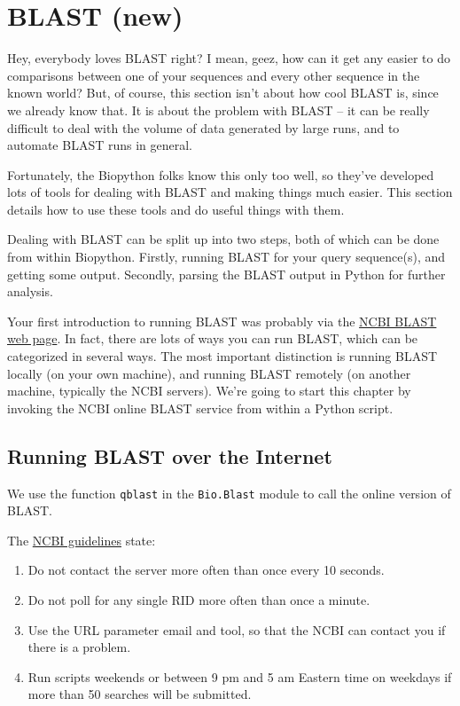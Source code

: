 \chapter{BLAST (new)}
\label{chapter:blast}
Hey, everybody loves BLAST right? I mean, geez, how can it get any easier to do comparisons between one of your sequences and every other sequence in the known world? But, of course, this section isn't about how cool BLAST is, since we already know that. It is about the problem with BLAST -- it can be really difficult to deal with the volume of data generated by large runs, and to automate BLAST runs in general.

Fortunately, the Biopython folks know this only too well, so they've developed lots of tools for dealing with BLAST and making things much easier. This section details how to use these tools and do useful things with them.

Dealing with BLAST can be split up into two steps, both of which can be done from within Biopython.
Firstly, running BLAST for your query sequence(s), and getting some output.
Secondly, parsing the BLAST output in Python for further analysis.

Your first introduction to running BLAST was probably via the \href{https://blast.ncbi.nlm.nih.gov/Blast.cgi}{NCBI BLAST web page}.
In fact, there are lots of ways you can run BLAST, which can be categorized in several ways.
The most important distinction is running BLAST locally (on your own machine),
and running BLAST remotely (on another machine, typically the NCBI servers).
We're going to start this chapter by invoking the NCBI online BLAST service
from within a Python script.

\section{Running BLAST over the Internet}
\label{sec:running-www-blast}

We use the function \verb|qblast| in the \verb|Bio.Blast| module to call the
online version of BLAST.

The \href{https://blast.ncbi.nlm.nih.gov/doc/blast-help/developerinfo.html#developerinfo}{NCBI guidelines} state:
\begin{enumerate}
\item Do not contact the server more often than once every 10 seconds.
\item Do not poll for any single RID more often than once a minute.
\item Use the URL parameter email and tool, so that the NCBI can contact you if there is a problem.
\item Run scripts weekends or between 9 pm and 5 am Eastern time on weekdays if more than 50 searches will be submitted.
\end{enumerate}

